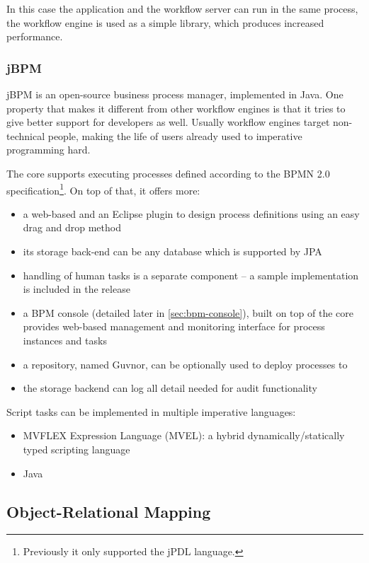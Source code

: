 In this case the application and the workflow server can run in the same
process, the workflow engine is used as a simple library, which produces
increased performance.

\subsubsection*{jBPM}

jBPM \cite{jbpm} is an open-source business process manager, implemented in
Java. One property that makes it different from other workflow engines is that
it tries to give better support for developers as well. Usually workflow
engines target non-technical people, making the life of users already used to
imperative programming hard.

The core supports executing processes defined according to the BPMN 2.0
specification\footnote{Previously it only supported the jPDL language.}. On top of that, it offers more:

\begin{itemize}
\item a web-based and an Eclipse plugin to design process definitions using an easy drag and drop method
\item its storage back-end can be any database which is supported by JPA\cite{jpa}
\item handling of human tasks is a separate component -- a sample implementation is included in the release
\item a BPM console (detailed later in \autoref{sec:bpm-console}), built
on top of the core provides web-based management and monitoring interface for
process instances and tasks
\item a repository, named Guvnor, can be optionally used to deploy processes to
\item the storage backend can log all detail needed for audit functionality
\end{itemize}

Script tasks can be implemented in multiple imperative languages:

\begin{itemize}
\item MVFLEX Expression Language (MVEL): a hybrid dynamically/statically typed scripting language
\item Java
\end{itemize}

\subsection{Object-Relational Mapping}

